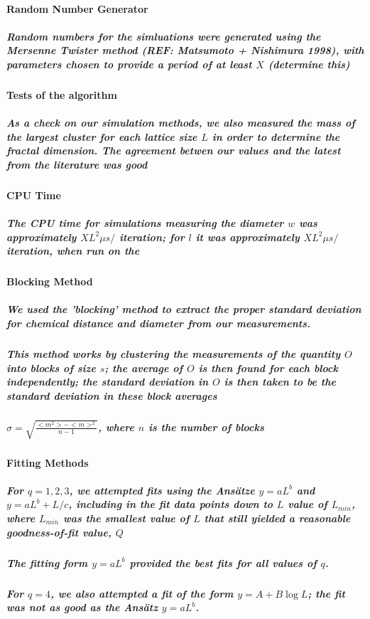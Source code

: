 \documentclass[pre,preprint]{revtex4-1}
\begin{document}
\paragraph{Random Number Generator}
\label{sec-1.2.5.5}
\subparagraph{Random numbers for the simluations were generated using the Mersenne Twister method (REF:  Matsumoto + Nishimura 1998), with parameters chosen to provide a period of at least $X$ (determine this)}
\label{sec-1.2.5.5.1}
\paragraph{Tests of the algorithm}
\label{sec-1.2.5.6}
\subparagraph{As a check on our simulation methods, we also measured the mass of the largest cluster for each lattice size $L$ in order to determine the fractal dimension.  The agreement betwen our values and the latest from the literature was good}
\label{sec-1.2.5.6.1}
\paragraph{CPU Time}
\label{sec-1.2.5.7}
\subparagraph{The CPU time for simulations measuring the diameter $w$ was approximately $X L^2 \mu s /$ iteration; for $l$ it was approximately $X L^2 \mu s /$ iteration, when run on the}
\label{sec-1.2.5.7.1}
\paragraph{Blocking Method}
\label{sec-1.3.1}
\subparagraph{We used the 'blocking' method \cite{NeBa99} to extract the proper standard deviation for chemical distance and diameter from our measurements.}
\label{sec-1.3.1.1}
\subparagraph{This method works by clustering the measurements of the quantity $O$ into blocks of size $s$; the average of $O$ is then found for each block independently;  the standard deviation in $O$ is then taken to be the standard deviation in these block averages}
\label{sec-1.3.1.2}
\subparagraph{$\sigma=\sqrt{ \frac{< m^2 > - < m >  ^2}{n-1}}$, where $n$ is the number of blocks}
\label{sec-1.3.1.3}
\paragraph{Fitting Methods}
\label{sec-1.3.2}
\subparagraph{For $q=1,2,3$, we attempted fits using the Ans\"{a}tze $y=aL^b$ and $y=aL^b+L/c$, including in the fit data points down to $L$ value of $L_{min}$, where $L_{min}$ was the smallest value of $L$ that still yielded a reasonable goodness-of-fit value, $Q$}
\label{sec-1.3.2.1}
\subparagraph{The fitting form $y=aL^b$ provided the best fits for all values of $q$.}
\label{sec-1.3.2.2}
\subparagraph{For $q=4$, we also attempted a fit of the form $y=A+B \log L$; the fit was not as good as the Ans\"{a}tz $y=aL^b$.}
\label{sec-1.3.2.3}
\end{document}
